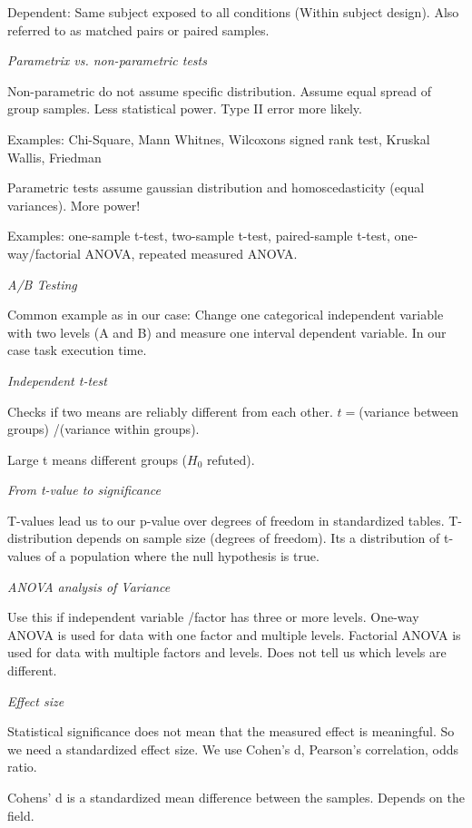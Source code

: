 Dependent: Same subject exposed to all conditions (Within subject design). Also referred to as matched pairs or paired samples. \medskip


\textit{Parametrix vs. non-parametric tests} \smallskip

Non-parametric do not assume specific distribution. Assume equal spread of group samples. Less statistical power. Type II error more likely. 

Examples: Chi-Square, Mann Whitnes, Wilcoxons signed rank test, Kruskal Wallis, Friedman \medskip

Parametric tests assume gaussian distribution and homoscedasticity (equal variances). More power!

Examples: one-sample t-test, two-sample t-test, paired-sample t-test, one-way/factorial ANOVA, repeated measured ANOVA. \medskip

\textit{A/B Testing} \smallskip

Common example as in our case: Change one categorical independent variable with two levels (A and B) and measure one interval dependent variable.
In our case task execution time. \medskip

\textit{Independent t-test} \smallskip

Checks if two means are reliably different from each other. $ t = $(variance between groups) /(variance within groups).

Large t means different groups ($H_0$ refuted). \medskip

\textit{From t-value to significance} \smallskip

T-values lead us to our p-value over degrees of freedom in standardized tables. 
T-distribution depends on sample size (degrees of freedom). Its a distribution of t-values of a population where the null hypothesis is true. \medskip

\textit{ANOVA analysis of Variance} \smallskip

Use this if independent variable /factor has three or more levels. One-way ANOVA is used for data with one factor and multiple levels. 
Factorial ANOVA is used for data with multiple factors and levels. Does not tell us which levels are different. \medskip

\textit{Effect size} \smallskip

Statistical significance does not mean that the measured effect is meaningful. So we need a standardized effect size. We use Cohen's d, Pearson's correlation, odds ratio. 

Cohens' d is a standardized mean difference between the samples. Depends on the field. 

